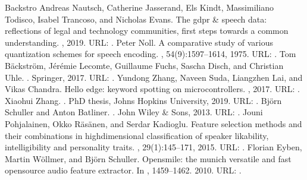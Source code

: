 \documentclass[letterpaper,10pt,english]{jupyterBook}
\begin{document}
\begin{sphinxthebibliography}{Backstro}
\sphinxAtStartPar
Andreas Nautsch, Catherine Jasserand, Els Kindt, Massimiliano Todisco, Isabel Trancoso, and Nicholas Evans. The gdpr \& speech data: reflections of legal and technology communities, first steps towards a common understanding. , 2019. URL: .
\sphinxAtStartPar
Peter Noll. A comparative study of various quantization schemes for speech encoding. , 54(9):1597–1614, 1975. URL: .
\sphinxAtStartPar
Tom Bäckström, Jérémie Lecomte, Guillaume Fuchs, Sascha Disch, and Christian Uhle. . Springer, 2017. URL: .
\sphinxAtStartPar
Yundong Zhang, Naveen Suda, Liangzhen Lai, and Vikas Chandra. Hello edge: keyword spotting on microcontrollers. , 2017. URL: .
\sphinxAtStartPar
Xiaohui Zhang. . PhD thesis, Johns Hopkins University, 2019. URL: .
\sphinxAtStartPar
Björn Schuller and Anton Batliner. . John Wiley \& Sons, 2013. URL: .
\sphinxAtStartPar
Jouni Pohjalainen, Okko Räsänen, and Serdar Kadioglu. Feature selection methods and their combinations in high\sphinxhyphen{}dimensional classification of speaker likability, intelligibility and personality traits. , 29(1):145–171, 2015. URL: .
\sphinxAtStartPar
Florian Eyben, Martin Wöllmer, and Björn Schuller. Opensmile: the munich versatile and fast open\sphinxhyphen{}source audio feature extractor. In , 1459–1462. 2010. URL: .

\end{sphinxthebibliography}
\end{document}
